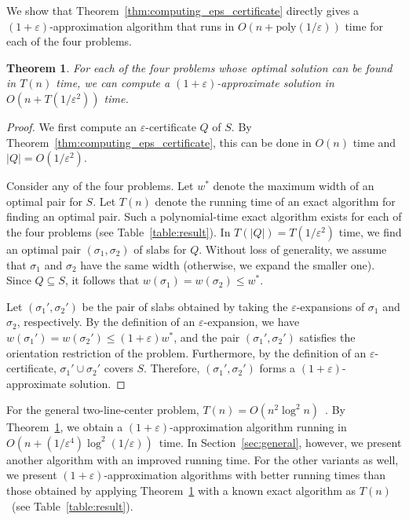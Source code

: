 \documentclass[10pt,a4paper]{article}
\newtheorem{theorem}{Theorem}
\newtheorem{observation}[theorem]{Observation}
\theoremstyle{star}
\theoremstyle{claimstar}
\newcommand{\eps}{\ensuremath{\varepsilon}}
\begin{document}

We show that Theorem~\ref{thm:computing_eps_certificate} directly gives a $(1+\eps)$-approximation algorithm that runs in $O(n + \mathrm{poly}(1/\eps))$ time for each of the four problems. 


\begin{theorem}
    \label{thm:poly_eps}
    For each of the four problems whose optimal solution can be found in $T(n)$ time, 
    we can compute a $(1+\eps)$-approximate solution in $O(n + T(1/\eps^2))$ time.
\end{theorem}

\begin{proof}
    
We first compute an $\eps$-certificate $Q$ of $S$. 
By Theorem~\ref{thm:computing_eps_certificate}, this can be done in $O(n)$ time and $|Q| = O(1/\eps^2)$.

Consider any of the four problems.
Let $w^*$ denote the maximum width of an optimal pair for $S$.  
Let $T(n)$ denote the running time of an exact algorithm for finding an optimal pair.
Such a polynomial-time exact algorithm exists for each of the four problems (see Table~\ref{table:result}).  
In $T(|Q|) = T(1/\eps^2)$ time, we find an optimal pair $(\sigma_1, \sigma_2)$ of slabs for $Q$.  
Without loss of generality, we assume that $\sigma_1$ and $\sigma_2$ have the same width (otherwise, we expand the smaller one).  
Since $Q \subseteq S$, it follows that $w(\sigma_1) = w(\sigma_2) \le w^*$.

Let $(\sigma_1', \sigma_2')$ be the pair of slabs obtained by taking the $\eps$-expansions of $\sigma_1$ and $\sigma_2$, respectively.  
By the definition of an $\eps$-expansion, we have $w(\sigma_1') = w(\sigma_2') \le (1+\eps)w^*$, and the pair $(\sigma_1', \sigma_2')$ satisfies the orientation restriction of the problem.  
Furthermore, by the definition of an $\eps$-certificate, $\sigma_1' \cup \sigma_2'$ covers $S$.  
Therefore, $(\sigma_1', \sigma_2')$ forms a $(1+\eps)$-approximate solution.
\end{proof}


For the general two-line-center problem, 
$T(n) = O(n^2 \log^2 n)$~\cite{jaromczyk1995}.
By Theorem~\ref{thm:poly_eps}, we obtain a $(1+\eps)$-approximation algorithm running in 
$O(n + (1/\eps^4) \log^2 (1/\eps))$~time. 
In Section~\ref{sec:general}, however, we present another algorithm with an improved running time. 
For the other variants as well, we present $(1+\eps)$-approximation algorithms with better running times than those obtained by applying Theorem~\ref{thm:poly_eps} with a known exact algorithm as $T(n)$~(see Table~\ref{table:result}).
\end{document}
